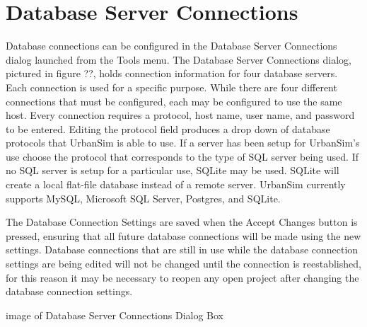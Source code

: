 \section{Database Server Connections}\label{sec:database-server-connections}

Database connections can be configured in the Database Server Connections dialog launched from the Tools menu.  The Database Server Connections dialog, pictured in figure ??, holds connection information for four database servers.  Each connection is used for a specific purpose.  While there are four different connections that must be configured, each may be configured to use the same host.  Every connection requires a protocol, host name, user name, and password to be entered.  Editing the protocol field produces a drop down of database protocols that UrbanSim is able to use.  If a server has been setup for UrbanSim's use choose the protocol that corresponds to the type of SQL server being used.  If no SQL server is setup for a particular use, SQLite may be used.  SQLite will create a local flat-file database instead of a remote server.  UrbanSim currently supports MySQL, Microsoft SQL Server, Postgres, and SQLite.

The Database Connection Settings are saved when the Accept Changes button is pressed, ensuring that all future database connections will be made using the new settings.  Database connections that are still in use while the database connection settings are being edited will not be changed until the connection is reestablished, for this reason it may be necessary to reopen any open project after changing the database connection settings.

image of Database Server Connections Dialog Box

